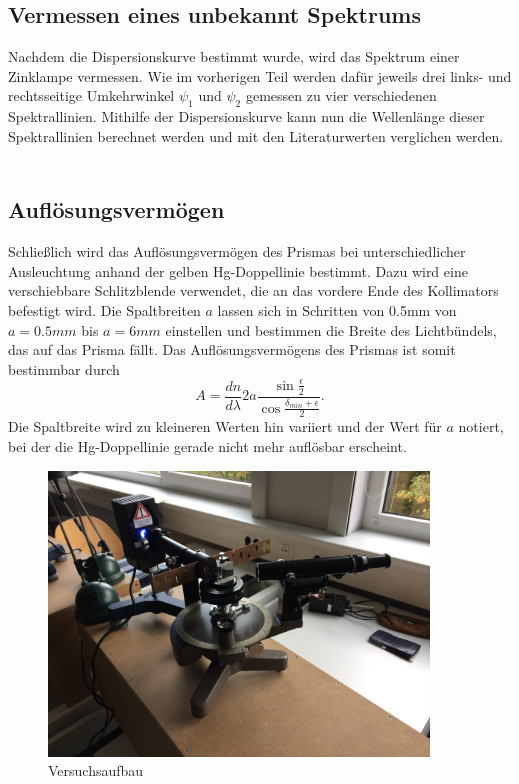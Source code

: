 \documentclass[12pt,a4paper]{article}
\begin{document}
\subsection{Vermessen eines unbekannt Spektrums}
Nachdem die Dispersionskurve bestimmt wurde, wird das Spektrum einer Zinklampe vermessen. Wie im vorherigen Teil werden dafür jeweils drei links- und rechtsseitige Umkehrwinkel $\psi_1$ und $\psi_2$ gemessen zu vier verschiedenen Spektrallinien. Mithilfe der Dispersionskurve kann nun die Wellenlänge dieser Spektrallinien berechnet werden und mit den Literaturwerten verglichen werden.\\\\
\subsection{Auflösungsvermögen}
Schließlich wird das Auflösungsvermögen des Prismas bei unterschiedlicher Ausleuchtung anhand der gelben Hg-Doppellinie bestimmt. Dazu wird eine verschiebbare Schlitzblende verwendet, die an das vordere Ende des Kollimators befestigt wird. Die Spaltbreiten $a$ lassen sich in Schritten von 0.5mm von $a=0.5mm$ bis $a=6mm$ einstellen und bestimmen die Breite des Lichtbündels, das auf das Prisma fällt. Das Auflösungsvermögens des Prismas ist somit bestimmbar durch
\begin{equation}
A=\frac{dn}{d\lambda}2a\frac{\sin{\frac{\epsilon}{2}}}{\cos{\frac{\delta_{min}+\epsilon}{2}}}.
\end{equation}
Die Spaltbreite wird zu kleineren Werten hin variiert und der Wert für $a$ notiert, bei der die Hg-Doppellinie gerade nicht mehr auflösbar erscheint.

\begin{figure}
	\centering
	\includegraphics[width=0.9\textwidth]{Bilder/Aufbau_Foto.jpg}
	\caption{Versuchsaufbau}
	\label{Aufbau_Foto}
\end{figure}
\end{document}
